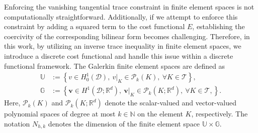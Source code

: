 \documentclass[final,onefignum,onetabnum]{mousaviart}
\begin{document}
	Enforcing the vanishing tangential trace constraint in finite element spaces is not computationally straightforward. Additionally, if we attempt to enforce this constraint by adding a squared term to the cost functional $E$, establishing the coercivity of the corresponding bilinear form becomes challenging. Therefore, in this work, by utilizing an inverse trace inequality in finite element spaces, we introduce a discrete cost functional and handle this issue within a discrete functional framework. The Galerkin finite element spaces are defined as
	\begin{equation}
		\label{def:Galerkin-spaces}
		\begin{aligned}
		\mathbb{U} &:= 
		\left\lbrace v \in H^1_0(\mathcal{D}),~ v|_{K} \in  
		\mathcal{P}_k(K), ~ \forall K \in \mathcal{T} \right\rbrace, 
		\\
		\mathbb{G} &:= 
		 \left\lbrace \boldsymbol{v} \in H^1(\mathcal{D}; \mathbb{R}^d) , ~ 
		 \boldsymbol{v}|_{K} \in  
		 \mathcal{P}_k(K; \mathbb{R}^d), ~ \forall K \in \mathcal{T}, \right\rbrace.
		\end{aligned}
	\end{equation}
%
	Here, $\mathcal{P}_k(K)$ and $\mathcal{P}_k(K; \mathbb{R}^d)$ denote the scalar-valued and vector-valued polynomial spaces of degree at most $k \in \mathbb{N}$ on the element $K$, respectively.
	The notation $N_{h,k}$ denotes the dimension of the finite element space $\mathbb{U} \times \mathbb{G}$.
%	
\end{document}
